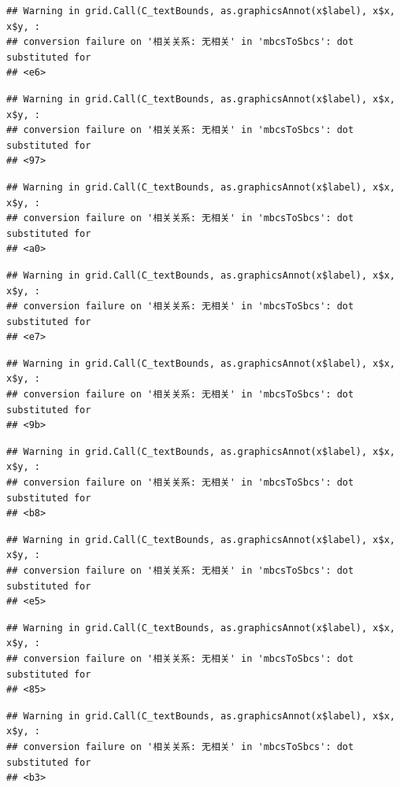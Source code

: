 \documentclass[
]{book}
\begin{document}
\begin{verbatim}
## Warning in grid.Call(C_textBounds, as.graphicsAnnot(x$label), x$x, x$y, :
## conversion failure on '相关关系: 无相关' in 'mbcsToSbcs': dot substituted for
## <e6>
\end{verbatim}

\begin{verbatim}
## Warning in grid.Call(C_textBounds, as.graphicsAnnot(x$label), x$x, x$y, :
## conversion failure on '相关关系: 无相关' in 'mbcsToSbcs': dot substituted for
## <97>
\end{verbatim}

\begin{verbatim}
## Warning in grid.Call(C_textBounds, as.graphicsAnnot(x$label), x$x, x$y, :
## conversion failure on '相关关系: 无相关' in 'mbcsToSbcs': dot substituted for
## <a0>
\end{verbatim}

\begin{verbatim}
## Warning in grid.Call(C_textBounds, as.graphicsAnnot(x$label), x$x, x$y, :
## conversion failure on '相关关系: 无相关' in 'mbcsToSbcs': dot substituted for
## <e7>
\end{verbatim}

\begin{verbatim}
## Warning in grid.Call(C_textBounds, as.graphicsAnnot(x$label), x$x, x$y, :
## conversion failure on '相关关系: 无相关' in 'mbcsToSbcs': dot substituted for
## <9b>
\end{verbatim}

\begin{verbatim}
## Warning in grid.Call(C_textBounds, as.graphicsAnnot(x$label), x$x, x$y, :
## conversion failure on '相关关系: 无相关' in 'mbcsToSbcs': dot substituted for
## <b8>
\end{verbatim}

\begin{verbatim}
## Warning in grid.Call(C_textBounds, as.graphicsAnnot(x$label), x$x, x$y, :
## conversion failure on '相关关系: 无相关' in 'mbcsToSbcs': dot substituted for
## <e5>
\end{verbatim}

\begin{verbatim}
## Warning in grid.Call(C_textBounds, as.graphicsAnnot(x$label), x$x, x$y, :
## conversion failure on '相关关系: 无相关' in 'mbcsToSbcs': dot substituted for
## <85>
\end{verbatim}

\begin{verbatim}
## Warning in grid.Call(C_textBounds, as.graphicsAnnot(x$label), x$x, x$y, :
## conversion failure on '相关关系: 无相关' in 'mbcsToSbcs': dot substituted for
## <b3>
\end{verbatim}
\end{document}
